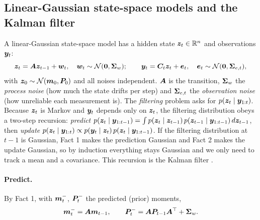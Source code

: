 \subsection{Linear-Gaussian state-space models and the Kalman filter}\label{sec:c08-kf}

A linear-Gaussian state-space model has a hidden state $\bm{z}_t\in\mathbb{R}^n$ and observations
$\bm{y}_t$:
\begin{equation}\label{eq:c08-lgssm}
  \bm{z}_t = \bm{A}\bm{z}_{t-1}+\bm{w}_t,\quad \bm{w}_t\sim\mathcal{N}(\bm{0},\bm{\Sigma}_w);\qquad
  \bm{y}_t = \bm{C}_t\bm{z}_t+\bm{e}_t,\quad \bm{e}_t\sim\mathcal{N}(\bm{0},\bm{\Sigma}_{e,t}),
\end{equation}
with $\bm{z}_0\sim\mathcal{N}(\bm{m}_0,\bm{P}_0)$ and all noises independent. $\bm{A}$ is the transition,
$\bm{\Sigma}_w$ the \emph{process noise} (how much the state drifts per step) and $\bm{\Sigma}_{e,t}$ the
\emph{observation noise} (how unreliable each measurement is). The \emph{filtering} problem asks
for $p(\bm{z}_t\mid\bm{y}_{1:t})$. Because $\bm{z}_t$ is Markov and $\bm{y}_t$ depends only on $\bm{z}_t$, the
filtering distribution obeys a two-step recursion: \emph{predict}
$p(\bm{z}_t\mid\bm{y}_{1:t-1})=\int p(\bm{z}_t\mid\bm{z}_{t-1})\,p(\bm{z}_{t-1}\mid\bm{y}_{1:t-1})\,d\bm{z}_{t-1}$, then
\emph{update} $p(\bm{z}_t\mid\bm{y}_{1:t})\propto p(\bm{y}_t\mid\bm{z}_t)\,p(\bm{z}_t\mid\bm{y}_{1:t-1})$. If the
filtering distribution at $t-1$ is Gaussian, Fact 1 makes the prediction Gaussian and Fact 2 makes
the update Gaussian, so by induction everything stays Gaussian and we only need to track a mean
and a covariance. This recursion is the Kalman filter \citep{c08-kalman1960,c08-sarkka2013bayesian}.

\paragraph{Predict.} By Fact 1, with $\bm{m}_t^-$, $\bm{P}_t^-$ the predicted (prior) moments,
\begin{equation}\label{eq:c08-kf-predict}
  \bm{m}_t^- = \bm{A}\bm{m}_{t-1}, \qquad \bm{P}_t^- = \bm{A}\bm{P}_{t-1}\bm{A}^{\top}+\bm{\Sigma}_w .
\end{equation}

